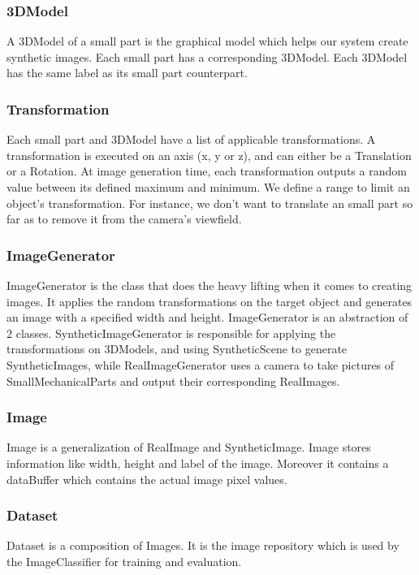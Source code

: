 \subsubsection{3DModel}
A 3DModel of a small part is the graphical model which helps our system create synthetic images. Each small part has a corresponding 3DModel. Each 3DModel has the same label as its small part counterpart.

\subsubsection{Transformation}
Each small part and 3DModel have a list of applicable transformations. A transformation is executed on an axis (x, y or z), and can either be a Translation or a Rotation.
At image generation time, each transformation outputs a random value between its defined maximum and minimum. We define a range to limit an object's transformation. For instance, we don't want to translate an small part so far as to remove it from the camera's viewfield.

\subsubsection{ImageGenerator}
ImageGenerator is the class that does the heavy lifting when it comes to creating images. It applies the random transformations on the target object and generates an image with a specified width and height.
ImageGenerator is an abstraction of 2 classes. SyntheticImageGenerator is responsible for applying the transformations on 3DModels, and using SyntheticScene to generate SyntheticImages, while RealImageGenerator uses a camera to take pictures of SmallMechanicalParts and output their corresponding RealImages.

\subsubsection{Image}
Image is a generalization of RealImage and SyntheticImage. Image stores information like width, height and label of the image. Moreover it contains a dataBuffer which contains the actual image pixel values.

\subsubsection{Dataset}
Dataset is a composition of Images. It is the image repository which is used by the ImageClassifier for training and evaluation.

